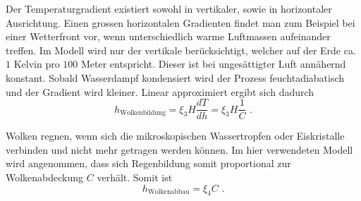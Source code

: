\begin{refsection}
Der Temperaturgradient existiert sowohl in vertikaler, sowie in horizontaler Ausrichtung. Einen grossen horizontalen Gradienten findet man zum Beispiel bei einer Wetterfront vor, wenn unterschiedlich warme Luftmassen aufeinander treffen. Im Modell wird nur der vertikale berücksichtigt, welcher auf der Erde ca. $1$ Kelvin pro $100$ Meter entspricht. Dieser ist bei ungesättigter Luft annähernd konstant. Sobald Wasserdampf kondensiert wird der Prozess feuchtadiabatisch und der Gradient wird kleiner. Linear approximiert ergibt sich dadurch
\begin{equation}
h_{\text{Wolkenbildung}} = \xi_3 H \frac{dT}{dh} = \xi_3 H \frac{1}{C} \text{ .}
\end{equation}

Wolken regnen, wenn sich die mikroskopischen Wassertropfen oder Eiskristalle verbinden und nicht mehr getragen werden können. Im hier verwendeten Modell wird angenommen, dass sich Regenbildung somit proportional zur Wolkenabdeckung $C$ verhält. Somit ist
\begin{equation}
h_{\text{Wolkenabbau}} = \xi_4 C \text{ .}
\end{equation}


%



\end{refsection}
